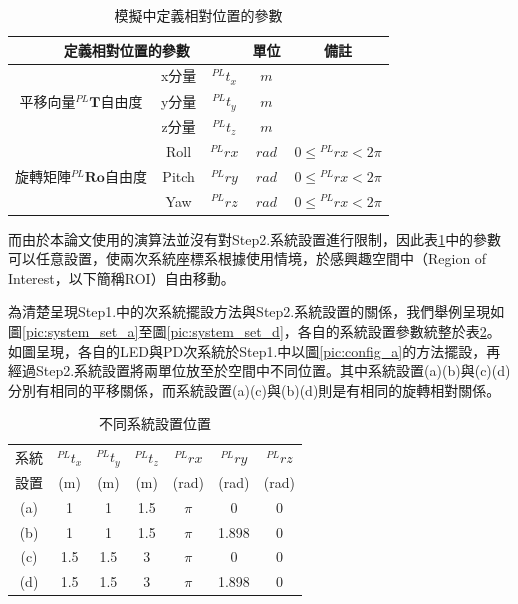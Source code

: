 \begin{table}[htpb]
    \renewcommand{\arraystretch}{1.3}
    \setlength{\arrayrulewidth}{0.15mm}
    \setlength{\doublerulesep}{0.12mm}
    \caption{模擬中定義相對位置的參數}
    \label{tab:para_relative}
    \centering
    \begin{tabular}{|c|cc|c|c|}
    \hline
    \multicolumn{3}{|c|}{\textbf{定義相對位置的參數}}  &\textbf{單位}  &  \textbf{備註}   \\
    \hline
    \multirow{3}{*}{平移向量$^{PL}\boldsymbol{T}$自由度} 
    & x分量 &$^{PL}t_x$ & $m$ &  \\
    & y分量 &$^{PL}t_y$ & $m$ &  \\
    & z分量 &$^{PL}t_z$ & $m$ &  \\
    \hline
    \multirow{3}{*}{旋轉矩陣$^{PL}\boldsymbol{Ro}$自由度} 
    & Roll &${^{PL}rx}$ & $rad$ &  $0\leq {^{PL}rx}<2\pi$\\
    & Pitch &$^{PL}ry$ & $rad$ & $0\leq {^{PL}rx}<2\pi$ \\
    & Yaw &$^{PL}rz$ & $rad$ & $0\leq {^{PL}rx}<2\pi$ \\
    \hline
    \end{tabular}
    \end{table}

    而由於本論文使用的演算法並沒有對Step2.系統設置進行限制，因此表\ref{tab:para_relative}中的參數可以任意設置，使兩次系統座標系根據使用情境，於感興趣空間中（Region of Interest，以下簡稱ROI）自由移動。

    為清楚呈現Step1.中的次系統擺設方法與Step2.系統設置的關係，我們舉例呈現如圖\ref{pic:system_set_a}至圖\ref{pic:system_set_d}，各自的系統設置參數統整於表\ref{tab:data_set_system}。如圖呈現，各自的LED與PD次系統於Step1.中以圖\ref{pic:config_a}的方法擺設，再經過Step2.系統設置將兩單位放至於空間中不同位置。其中系統設置(a)(b)與(c)(d)分別有相同的平移關係，而系統設置(a)(c)與(b)(d)則是有相同的旋轉相對關係。

    \begin{table}[htpb]
        \begin{center}
          \caption{不同系統設置位置}
          \label{tab:data_set_system}
          \begin{tabular}{c||c|c|c|c|c|c} %
             系統& $^{PL}t_x$ & $^{PL}t_y$&$^{PL}t_z$&$ ^{PL}rx$ & $^{PL}ry$&$^{PL}rz$\\
             設置& (m) & (m)&(m)&(rad) & (rad)&(rad)\\
            \hline
            (a)& 1 & 1&1.5&$\pi$ & 0&0\\
            (b)& 1 & 1&1.5&$\pi$ & 1.898&0\\
            (c)& 1.5 & 1.5&3&$\pi$ & 0&0\\
            (d)& 1.5 & 1.5&3&$\pi$ & 1.898&0\\
          \end{tabular}
        \end{center}
      \end{table}

